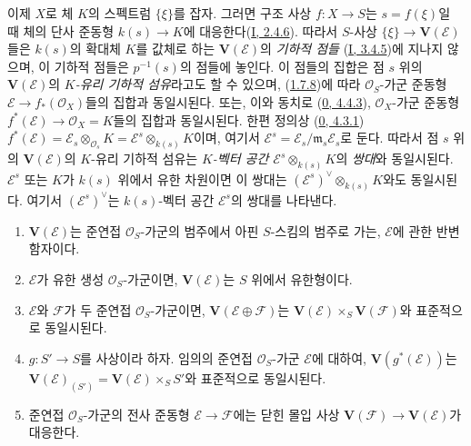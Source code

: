 \begin{env}[1.7.10]
\label{II.1.7.10-ko}
이제 $X$로 체 $K$의 스펙트럼 $\{\xi\}$를 잡자. 그러면 구조 사상
$f:X\to S$는 $s=f(\xi)$일 때 체의 단사 준동형
$k(s)\to K$에 대응한다(\hyperref[I.2.4.6-ko]{I, 2.4.6}). 따라서
$S$-사상 $\{\xi\}\to\mathbf{V}(\mathcal{E})$들은 $k(s)$의 확대체
$K$를 값체로 하는 $\mathbf{V}(\mathcal{E})$의 \emph{기하적 점들}
(\hyperref[I.3.4.5-ko]{I, 3.4.5})에 지나지 않으며, 이 기하적 점들은
$p^{-1}(s)$의 점들에 놓인다. 이 점들의 집합은 점 $s$ 위의
$\mathbf{V}(\mathcal{E})$의 \emph{$K$-유리 기하적 섬유}라고도 할 수
있으며, (\hyperref[II.1.7.8-ko]{1.7.8})에 따라 $\mathcal{O}_S$-가군
준동형 $\mathcal{E}\to f_*(\mathcal{O}_X)$들의 집합과 동일시된다.
또는, 이와 동치로 (\hyperref[0.4.4.3-ko]{0, 4.4.3}),
$\mathcal{O}_X$-가군 준동형
$f^*(\mathcal{E})\to\mathcal{O}_X=K$들의 집합과 동일시된다. 한편 정의상
(\hyperref[0.4.3.1-ko]{0, 4.3.1})
$f^*(\mathcal{E})=\mathcal{E}_s\otimes_{\mathcal{O}_s}K
=\mathcal{E}^s\otimes_{k(s)}K$이며, 여기서
$\mathcal{E}^s=\mathcal{E}_s/\mathfrak{m}_s\mathcal{E}_s$로 둔다.
따라서 점 $s$ 위의 $\mathbf{V}(\mathcal{E})$의 $K$-유리 기하적
섬유는 \emph{$K$-벡터 공간
$\mathcal{E}^s\otimes_{k(s)}K$}의 \emph{쌍대}와 동일시된다.
$\mathcal{E}^s$ 또는 $K$가 $k(s)$ 위에서 유한 차원이면 이 쌍대는
$(\mathcal{E}^s)^\vee\otimes_{k(s)}K$와도 동일시된다. 여기서
$(\mathcal{E}^s)^\vee$는 $k(s)$-벡터 공간 $\mathcal{E}^s$의 쌍대를
나타낸다.
\end{env}

\begin{proposition}[1.7.11]
\label{II.1.7.11-ko}
\begin{enumerate}
  \item[\rm(i)] $\mathbf{V}(\mathcal{E})$는 준연접
    $\mathcal{O}_S$-가군의 범주에서 아핀 $S$-스킴의 범주로 가는,
    $\mathcal{E}$에 관한 반변 함자이다.
  \item[\rm(ii)] $\mathcal{E}$가 유한 생성 $\mathcal{O}_S$-가군이면,
    $\mathbf{V}(\mathcal{E})$는 $S$ 위에서 유한형이다.
  \item[\rm(iii)] $\mathcal{E}$와 $\mathcal{F}$가 두 준연접
    $\mathcal{O}_S$-가군이면,
    $\mathbf{V}(\mathcal{E}\oplus\mathcal{F})$는
    $\mathbf{V}(\mathcal{E})\times_S\mathbf{V}(\mathcal{F})$와
    표준적으로 동일시된다.
  \item[\rm(iv)] $g:S'\to S$를 사상이라 하자. 임의의 준연접
    $\mathcal{O}_S$-가군 $\mathcal{E}$에 대하여,
    $\mathbf{V}(g^*(\mathcal{E}))$는
    $\mathbf{V}(\mathcal{E})_{(S')}
    =\mathbf{V}(\mathcal{E})\times_S S'$와 표준적으로 동일시된다.
  \item[\rm(v)] 준연접 $\mathcal{O}_S$-가군의 전사 준동형
    $\mathcal{E}\to\mathcal{F}$에는 닫힌 몰입 사상
    $\mathbf{V}(\mathcal{F})\to\mathbf{V}(\mathcal{E})$가 대응한다.
\end{enumerate}
\end{proposition}


